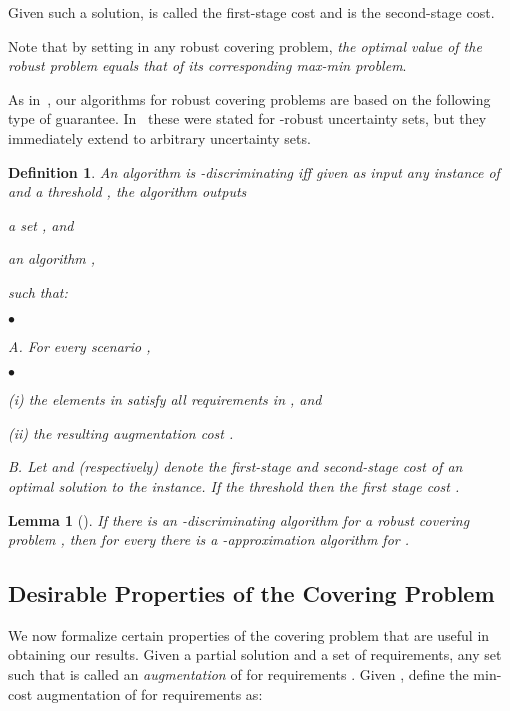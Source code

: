 \documentclass[11pt,letterpaper]{article}
\newtheorem{definition}[theorem]{Definition}
\newtheorem{lemma}[theorem]{Lemma}
\newcounter{note}[section]
\newcommand{\initOneLiners}{\setlength{\itemsep}{0pt}
    \setlength{\parsep }{0pt}
    \setlength{\topsep }{0pt}
}
\newenvironment{OneLiners}[1][\ensuremath{\bullet}]
    {\begin{list}
        {#1}
        {\initOneLiners}}
    {\end{list}}
\begin{document}
Given such a solution,  is called the first-stage cost and
 is the second-stage cost.


Note that by setting  in any robust covering problem, \emph{the optimal value of the robust problem equals
that of its corresponding max-min problem}.


As in~\cite{GNR-k-rob}, our algorithms for robust covering problems are based on the following type of guarantee.
In~\cite{GNR-k-rob} these were stated for -robust uncertainty sets, but they immediately extend to arbitrary
uncertainty sets.
\begin{definition}\label{defn:algo}
  An algorithm is \emph{-discriminating} iff
  given as input any instance of  and a threshold , the
  algorithm outputs
  \begin{inparaenum}[(i)]
  \item a set , and
  \item an algorithm ,
  \end{inparaenum}
  such that:
  \begin{OneLiners}
  \item[A.] For every scenario ,
    \begin{OneLiners}
    \item[(i)] the elements in  satisfy all
      requirements in , and
    \item[(ii)] the resulting augmentation cost
      .
    \end{OneLiners}
  \item[B.] Let  and  (respectively) denote the
    first-stage and second-stage cost of an optimal solution to the
     instance. If the threshold  then the first stage
    cost .
  \end{OneLiners}
\end{definition}

\begin{lemma}[\cite{GNR-k-rob}]\label{lem:apx}
  If there is an -discriminating algorithm
  for a robust covering problem , then for every 
  there is a -approximation algorithm for .
\end{lemma}

\subsection{Desirable Properties of the Covering Problem} We now formalize certain properties of the covering problem
 that are useful in obtaining our results.
Given a partial solution  and a set  of requirements, any set  such that  is called an \emph{augmentation} of  for requirements . Given , define
the min-cost augmentation of  for requirements  as:
\end{document}
